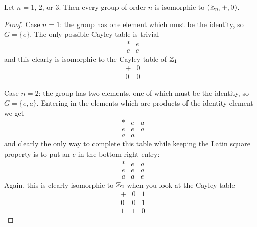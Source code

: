 \begin{theorem}
  Let $n = 1$, $2$, or $3$.  Then every group of order $n$ is isomorphic to
  $(\mathbb{Z}_{n}, +, 0)$.
\end{theorem}
\begin{proof}
  Case $n=1$: the group has one element which must be the identity,
  so $G = \{e\}$.  The only possible Cayley table is trivial
  \[
    \begin{array}{c|c}
      \ast & e \\
       \hline
     e & e
    \end{array}
  \]
  and this clearly is isomorphic to the Cayley table of $\mathbb{Z}_{1}$
  \[
    \begin{array}{c|c}
      + & 0 \\
      \hline
      0 & 0
    \end{array}
  \]

  Case $n=2$: the group has two elements, one of which must be the identity,
  so $G = \{e, a\}$.  Entering in the elements which are products of the
  identity element we get
  \[
    \begin{array}{c|cc}
      \ast & e & a \\
      \hline
      e & e & a \\
      a & a &  
    \end{array}
  \]
  and clearly the only way to complete this table while keeping the Latin
  square property is to put an $e$ in the bottom right entry:
  \[
    \begin{array}{c|cc}
      \ast & e & a \\
      \hline
      e & e & a \\
      a & a & e 
    \end{array}
  \]
  Again, this is clearly isomorphic to $\mathbb{Z}_{2}$ when you look at the
  Cayley table
  \[
    \begin{array}{c|cc}
      + & 0 & 1 \\
      \hline
      0 & 0 & 1 \\
      1 & 1 & 0 
    \end{array}
  \]


\end{proof}
